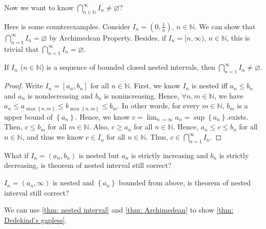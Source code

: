 Now we want to know \(\bigcap_{n \in \mathbb{N} }^{\infty} I_n \neq \varnothing \)?

Here is some counterexamples. Consider \(I_n = (0, \frac{1}{n})\), \(n \in \mathbb{N} \). We can show that \(\bigcap_{n=1}^{\infty} I_n = \varnothing  \) by Archimedean Property. Besides, if \(I_n = [n, \infty )\), \(n \in \mathbb{N} \), this is trivial that \(\bigcap_{n=1}^{\infty} I_n = \varnothing  \). 

\begin{theorem}\label{thm: nested interval}
    If \(I_n\) (\(n \in \mathbb{N} \)) is a sequence of bounded closed nested intervals, then \(\bigcap_{n=1}^{\infty} I_n \neq \varnothing  \).  
\end{theorem}

\begin{proof}
    Write \(I_n = [a_n,b_n]\) for all \(n \in \mathbb{N} \). First, we know \(I_n\) is nested iff \(a_n \le b_n\) and \(a_n\) is nondecreasing and \(b_n\) is nonincreasing. Hence, \(\forall n,m \in \mathbb{N} \), we have \(a_n \le a_{\max \left\{ n,m \right\} } \le b_{\max \left\{ n,m \right\} } \le b_m\). In other words, for every \(m \in \mathbb{N} \), \(b_m\) is a upper bound of \(\left\{ a_n \right\} \). Hence, we know \(c = \lim_{n \to \infty} a_n  = \sup \left\{ a_n \right\} \).exists. Then, \(c \le b_m\) for all \(m \in \mathbb{N} \). Also, \(c \ge a_n\) for all \(n \in \mathbb{N} \). Hence, \(a_n \le c \le b_n\) for all \(n \in \mathbb{N} \), and thus we know \(c \in I_n\) for all \(n \in \mathbb{N} \). Thus, \(c \in \bigcap_{n=1}^{\infty} I_n \).                     
\end{proof}

\begin{exercise}
    What if \(I_n = (a_n, b_n)\) is nested but \(a_n\) is strictly increasing and \(b_n\) is strictly decreasing, is theorem of nested interval still correct?   
\end{exercise}

\begin{exercise}
    \(I_n = (a_n, \infty )\) is nested and \(\left\{ a_n \right\} \) bounded from above, is theorem of nested interval still correct?  
\end{exercise}

\begin{exercise}
    We can use \autoref{thm: nested interval} and \autoref{thm: Archimedean} to show \autoref{thm: Dedekind's gapless}.   
\end{exercise}

